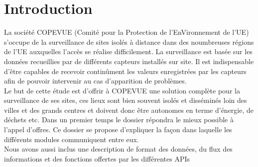 \section{Introduction}

La société COPEVUE (Comité pour la Protection de l’EnVironnement de l’UE) s’occupe de la surveillance de sites isolés à distance dans des noumbreuses régions de l'UE auxquelles l’accès se réalise difficilement. La surveillance est basée sur les données recueillies par de différents capteurs installés sur site. Il est indispensable d’être capables de recevoir continûment les valeurs enregistrées par les capteurs afin de pouvoir intervenir au cas d’apparition de problèmes. \\
Le but de cette étude est d’offrir à COPEVUE une solution complète pour la surveillance de ses sites, ces lieux sont bien souvent isolés et disséminés loin des villes et des grands centres et doivent donc être autonomes en terme d’énergie, de déchets etc.
Dans un premier temps le dossier répondra le mieux possible à l’appel d’offres. Ce dossier se propose d’expliquer la façon dans laquelle les différents modules communiquent entre eux. \\
Nous avons aussi inclus une description de format des données, du flux des informations et des fonctions offertes par les différentes APIs

\pagebreak